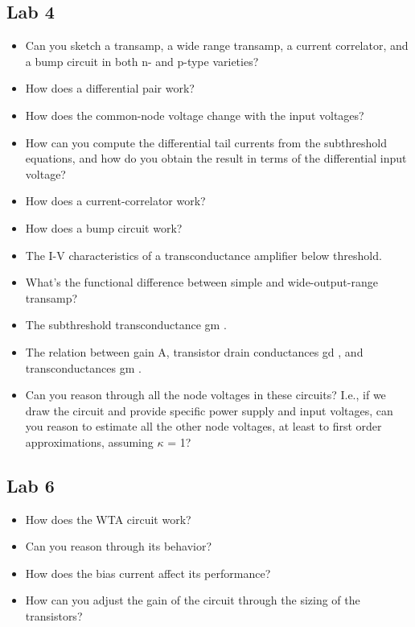 \subsection{Lab 4}
\begin{itemize}
\item Can you sketch a transamp, a wide range transamp, a current correlator, and a bump circuit
in both n- and p-type varieties?
\item How does a differential pair work? \item How does the common-node voltage change with the
input voltages? \item How can you compute the differential tail currents from the subthreshold
equations, and how do you obtain the result in terms of the differential input voltage?
\item How does a current-correlator work? \item How does a bump circuit work?
\item The I-V characteristics of a transconductance amplifier below threshold. \item What’s the
functional difference between simple and wide-output-range transamp? \item The subthreshold
transconductance gm . \item The relation between gain A, transistor drain conductances gd , and
transconductances gm .
\item Can you reason through all the node voltages in these circuits? I.e., if we draw the circuit
and provide specific power supply and input voltages, can you reason to estimate all the
other node voltages, at least to first order approximations, assuming $\kappa$ = 1?
\end{itemize}



\subsection{Lab 6}
\begin{itemize}
\item How does the WTA circuit work? \item Can you reason through its behavior? \item How does the bias
current affect its performance? \item How can you adjust the gain of the circuit through the sizing
of the transistors?
\end{itemize}


